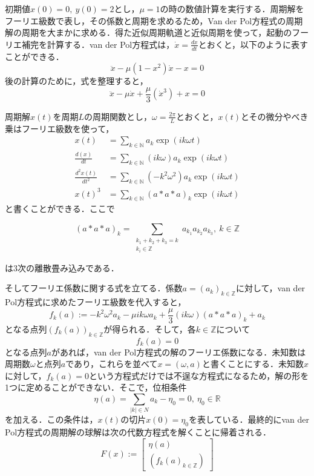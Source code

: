 初期値$x(0)=0,\ y(0)=2$とし，$\mu=1$の時の数値計算を実行する．周期解をフーリエ級数で表し，その係数と周期を求めるため，Van der Pol方程式の周期解の周期を大まかに求める．得た近似周期軌道と近似周期を使って，起動のフーリエ補完を計算する．van der Pol方程式は，$\dot{x}=\frac{dx}{dt}$とおくと，以下のように表すことができる．
\begin{equation*}
  \ddot{x} - \mu (1-x^2)\dot{x} - x = 0
\end{equation*}
後の計算のために，式を整理すると，
\begin{equation*}
  \ddot{x} - \mu \dot{x} + \frac{\mu}{3} \left(\dot{x}^3\right) + x = 0
\end{equation*}

周期解$x(t)$を周期$L$の周期関数とし，$\omega = \frac{2\pi}{L}$とおくと，$x(t)$とその微分やべき乗はフーリエ級数を使って，
\begin{align*}
  x(t)                 & = \sum_{k\in\mathbb{N}} a_k \exp(ik \omega t)                \\
  \frac{d(x)}{dt}      & = \sum_{k\in\mathbb{N}} (ik \omega) a_k \exp(ik \omega t)    \\
  \frac{d^2x(t)}{dt^2} & = \sum_{k\in\mathbb{N}} (-k^2\omega^2) a_k \exp(ik \omega t) \\
  x(t)^3               & = \sum_{k\in\mathbb{N}} (a*a*a)_k \exp(ik \omega t)
\end{align*}
と書くことができる．ここで

\begin{equation*}
  (a*a*a)_k = \sum_{\substack{k_1+k_2+k_3=k\\k_i\in\mathbb{Z}}} a_{k_1}a_{k_2}a_{k_3},\ k\in\mathbb{Z}
\end{equation*}

は3次の離散畳み込みである．

そしてフーリエ係数に関する式を立てる．係数$a=\left(a_k\right)_{k\in\mathbb{Z}}$に対して，van der Pol方程式に求めたフーリエ級数を代入すると，
\begin{equation*}
  f_k(a) := -k^2\omega^2 a_k - \mu ik \omega a_k + \frac{\mu}{3} (ik \omega)(a*a*a)_k + a_k
\end{equation*}
となる点列$(f_k(a))_{k\in\mathbb{Z}}$が得られる．そして，各$k\in\mathbb{Z}$について
\begin{equation*}
  f_k(a) = 0
\end{equation*}
となる点列$a$があれば，van der Pol方程式の解のフーリエ係数になる．未知数は周期数$\omega$と点列$a$であり，これらを並べて$x=(\omega,a)$と書くことにする．未知数$x$に対して，$f_k(a)=0$という方程式だけでは不逞な方程式になるため，解の形を1つに定めることができない．そこで，位相条件
\begin{equation*}
  \eta(a) = \sum_{|k|\in N} a_k-\eta_0 = 0,\ \eta_0\in\mathbb{R}
\end{equation*}
を加える．この条件は，$x(t)$の切片$x(0)=\eta_0$を表している．最終的にvan der Pol方程式の周期解の球解は次の代数方程式を解くことに帰着される．
\begin{equation*}
  F(x) := \begin{bmatrix}
    \eta(a) \\
    \left(f_k(a)_{k\in\mathbb{Z}}\right)
  \end{bmatrix}
\end{equation*}

